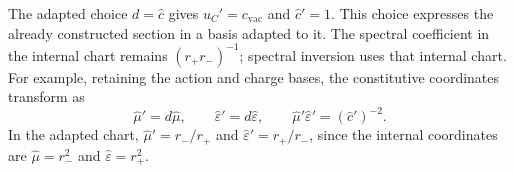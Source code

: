 The adapted choice $d=\widehat c$ gives $u_C'=c_{\mathrm{vac}}$ and
$\widehat c'=1$. This choice expresses the already constructed section in a
basis adapted to it. The spectral coefficient in the internal chart remains
$(r_+r_-)^{-1}$; spectral inversion uses that internal chart.
For example, retaining the action and charge bases, the constitutive
coordinates transform as
\[
 \widehat\mu'=d\widehat\mu,
 \qquad \widehat\varepsilon'=d\widehat\varepsilon,
 \qquad
 \widehat\mu'\widehat\varepsilon'=(\widehat c')^{-2}.
\]
In the adapted chart, $\widehat\mu'=r_-/r_+$ and
$\widehat\varepsilon'=r_+/r_-$, since the internal coordinates are
$\widehat\mu=r_-^2$ and $\widehat\varepsilon=r_+^2$.
